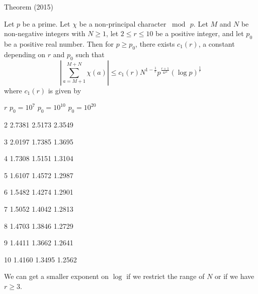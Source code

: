 \begin{thm}{Theorem (2015)}

Let $p$ be a prime. Let $\chi$ be a non-principal character
$\bmod{\,p}$. Let $M$ and $N$ be non-negative integers with $N\ge 1$,
let $2\le r\le 10$ be a positive integer, and let $p_0$ be a positive
real number. Then for $p \ge p_0$, there exists $c_1(r)$, a constant
depending on $r$ and $p_0$ such that 
$$
\left|\sum_{a=M+1}^{M+N}\chi(a)\right|
\le
c_1(r) N^{1-\frac{1}{r}} p^{\frac{r+1}{4r^2}}(\log{p})^{\frac{1}{r}}
$$
where $c_1(r)$ is given by

  
  
    
      $r$
      $p_0=10^7$
      $p_0=10^{10}$
      $p_0=10^{20}$
    
  
  
    2
    2.7381
    2.5173
    2.3549
  
  
    3
    2.0197
    1.7385
    1.3695
  
  
    4
    1.7308
    1.5151
    1.3104
  
  
    5
    1.6107
    1.4572
    1.2987
  
  
    6
    1.5482
    1.4274
    1.2901
  
  
    7
    1.5052
    1.4042
    1.2813
  
  
    8
    1.4703
    1.3846
    1.2729
  
  
    9
    1.4411
    1.3662
    1.2641
  
  
    10
    1.4160
    1.3495
    1.2562
  


\end{thm}



 We can get  a smaller exponent on $\log$ if we restrict the range of
 $N$ or if we have $r\ge 3$.

